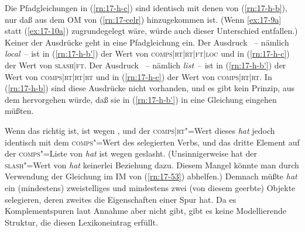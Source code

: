 \documentclass[output=paper]{LSP/langsci}
\begin{document}
\Hack{\enlargethispage{-\baselineskip}}
Die Pfadgleichungen in (\ref{rn:17-h-c}) sind identisch mit denen von (\ref{rn:17-h-b}), nur daß
 aus dem OM von (\ref{rn:17-celr}) hinzugekommen ist. (Wenn \eqref{ex:17-9a} statt (\ref{ex:17-10a}) zugrundegelegt wäre, würde auch dieser Unterschied entfallen.) Keiner
der  Ausdrücke geht in eine Pfadgleichung ein. Der Ausdruck ~-- nämlich {\glqq}\textit{local}{\grqq}~-- ist in (\ref{rn:17-h-b'}) der Wert von \textsc{comps|rt|rt|ft|loc} und in (\ref{rn:17-h-c}) der Wert von \textsc{slash|ft}. Der Ausdruck ~-- nämlich {\glqq}\textit{list}{\grqq}~-- ist in (\ref{rn:17-h-b'}) der Wert von \textsc{comps|rt|rt|rt} und in (\ref{rn:17-h-c}) der Wert von \textsc{comps|rt|rt}. In (\ref{rn:17-h-b}) sind diese Ausdrücke nicht vorhanden, und es gibt kein Prinzip, aus dem hervorgehen würde, daß sie in (\ref{rn:17-h-b'}) in eine Gleichung eingehen müßten.

\randnum\label{rn:17-62}Wenn das richtig ist, ist wegen
,  und  der \textsc{comps|rt}"=Wert dieses \textit{hat} jedoch identisch mit dem
\textsc{comps}"=Wert des selegierten Verbs, und das dritte Element auf der
\textsc{comps}"=Liste von \textit{hat} ist wegen 
geslasht. (Unsinnigerweise hat der \textsc{slash}"=Wert von \textit{hat} keinerlei Beziehung dazu. Diesem Mangel könnte man
durch Verwendung der Gleichung im IM von (\ref{rn:17-53}) abhelfen.) Demnach
müßte \textit{hat} ein (mindestens) zweistelliges  und mindestens zwei (von
diesem  geerbte) Objekte selegieren, deren zweites die
Eigenschaften einer Spur hat. Da es Komplementspuren laut Annahme aber
nicht gibt, gibt es keine Modellierende Struktur, die diesen
Lexikoneintrag erfüllt.
\end{document}
